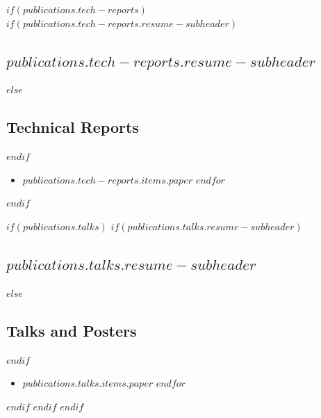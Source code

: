 \documentclass[letterpaper,10pt,final,sans]{moderncv}
\begin{document}
$if(publications.tech-reports)$
$if(publications.tech-reports.resume-subheader)$
\subsection{$publications.tech-reports.resume-subheader$}
$else$
\subsection{Technical Reports}
$endif$
\begin{itemize}
$for(publications.tech-reports.items)$
\item $publications.tech-reports.items.paper$
$endfor$
\end{itemize}
$endif$

$if(publications.talks)$
$if(publications.talks.resume-subheader)$
\subsection{$publications.talks.resume-subheader$}
$else$
\subsection{Talks and Posters}
$endif$
\begin{itemize}
$for(publications.talks.items)$
\item $publications.talks.items.paper$
$endfor$
\end{itemize}
$endif$
$endif$
$endif$

\end{document}
